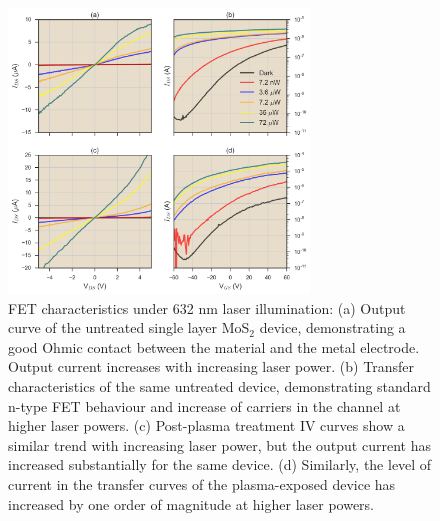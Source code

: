 \documentclass[%
 reprint,
superscriptaddress,
 amsmath,amssymb,
 aps,
prb,
]{revtex4-1}
\begin{document}
\begin{center}
\begin{figure}[!htb]
\includegraphics[width=80mm]{Fig_1}
\caption{FET characteristics under 632 nm laser illumination: (a) Output curve of the untreated single layer MoS$_2$ device, demonstrating a good Ohmic contact between the material and the metal electrode. Output current increases with increasing laser power. (b) Transfer characteristics of the same untreated device, demonstrating standard n-type  FET behaviour and increase of carriers in the channel at higher laser powers. (c) Post-plasma treatment IV curves show a similar trend with increasing laser power, but the output current has increased substantially for the same device. (d) Similarly, the level of current in the transfer curves of the plasma-exposed device has increased by one order of magnitude at higher laser powers.}
\end{figure}
\end{center}
\end{document}
